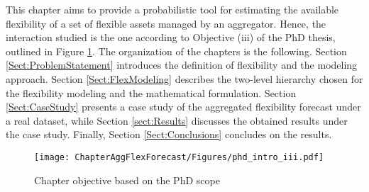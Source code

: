 This chapter aims to provide a probabilistic tool for estimating the available flexibility of a set of flexible assets managed by an aggregator. Hence, the interaction studied is the one according to Objective (iii) of the PhD thesis, outlined in Figure \ref{fig:chapter_obj_iii}. The organization of the chapters is the following. Section \ref{Sect:ProblemStatement} introduces the definition of flexibility and the modeling approach. Section \ref{Sect:FlexModeling} describes the two-level hierarchy chosen for the flexibility modeling and the mathematical formulation. Section \ref{Sect:CaseStudy} presents a case study of the aggregated flexibility forecast under a real dataset, while Section \ref{sect:Results} discusses the obtained results under the case study. Finally, Section \ref{Sect:Conclusions} concludes on the results.

\begin{figure}[h]
	\centering
	\texttt{[image: ChapterAggFlexForecast/Figures/phd\_intro\_iii.pdf]}
		\caption{Chapter objective based on the PhD scope}
	\label{fig:chapter_obj_iii}  
\end{figure}

